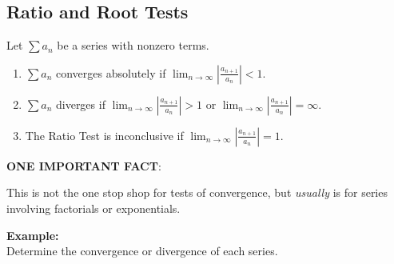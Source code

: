 \subsection*{Ratio and Root Tests}

\begin{tcolorbox}[title= THE RATIO TEST,sharp corners,colback=white,colbacktitle=white,coltitle=black]

    Let     $\displaystyle\sum a_n$ be a series with nonzero terms.
    \begin{enumerate}
        \item $\displaystyle\sum a_n$ converges absolutely if $\displaystyle\lim_{n\to\infty}\left|\frac{a_{n+1}}{a_n}\right|<1$.
        \item $\displaystyle\sum a_n$ diverges if $\displaystyle\lim_{n\to\infty}\left|\frac{a_{n+1}}{a_n}\right|>1$ or $\displaystyle\lim_{n\to\infty}\left|\frac{a_{n+1}}{a_n}\right|=\infty$.
        \item The Ratio Test is inconclusive if $\displaystyle\lim_{n\to\infty}\left|\frac{a_{n+1}}{a_n}\right|=1$.
    \end{enumerate}

\end{tcolorbox}
\vspace{.1in}
\noindent\textbf{ONE IMPORTANT FACT}:
\begin{questions}
    \question This is not the one stop shop for tests of convergence, but \textit{usually} is for series involving factorials or exponentials.
\end{questions}
\vspace{.1in}

\noindent\textbf{Example:}\\
Determine the convergence or divergence of each series.

